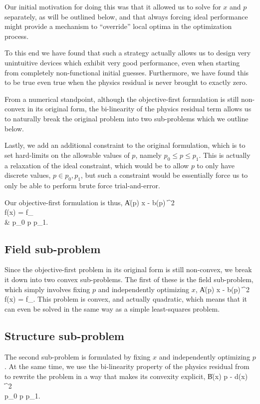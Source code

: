 Our initial motivation for doing this 
    was that it allowed us to solve for $x$ and $p$ separately,
    as will be outlined below,
    and that always forcing ideal performance
    might provide a mechanism to ``override'' local optima 
    in the optimization process.

To this end we have found that such a strategy
    actually allows us to design very unintuitive devices
    which exhibit very good performance,
    even when starting from completely non-functional initial guesses.
Furthermore, we have found this to be true
    even true when the physics residual is never brought to exactly zero.

From a numerical standpoint, 
    although the objective-first formulation is still non-convex 
    in its original form,
    the bi-linearity of the physics residual term allows us to 
    naturally break the original problem into two sub-problems
    which we outline below.

Lastly, we add an additional constraint to the original formulation,
    which is to set hard-limits on the allowable values of $p$,
    namely $p_0 \le p \le p_1$.
This is actually a relaxation of the ideal constraint,
    which would be to allow $p$ to only have discrete values,
    $p \in p_0, p_1$,
    but such a constraint would be essentially force us to only
    be able to perform brute force trial-and-error.

Our objective-first formulation is thus,
\BA {} \| A(p) x - b(p) \|^2 \notag \\
    \subto f(x) = f_ \label{eq:ob1} \\
        & p_0 \le p \le p_1. \notag \EA


\subsection{Field sub-problem}
Since the objective-first problem in its original form is still non-convex,
    we break it down into two convex sub-problems.
The first of these is the field sub-problem, 
    which simply involves fixing $p$ and independently optimizing $x$,
\BA {} \| A(p) x - b(p) \|^2 \label{eq:Fsub} \\
    \subto f(x) = f_. \notag \EA
This problem is convex, and actually quadratic,
    which means that it can even be solved in the same way 
    as a simple least-squares problem.

\subsection{Structure sub-problem}
The second sub-problem is formulated by fixing $x$ and
    independently optimizing $p$.
At the same time, we use the bi-linearity property
    of the physics residual from 
    to rewrite the problem in a way that makes
    its convexity explicit,
\BA {} \| B(x) p - d(x) \|^2 \label{eq:Ssub} \\
    \subto p_0 \le p \le p_1. \notag \EA

